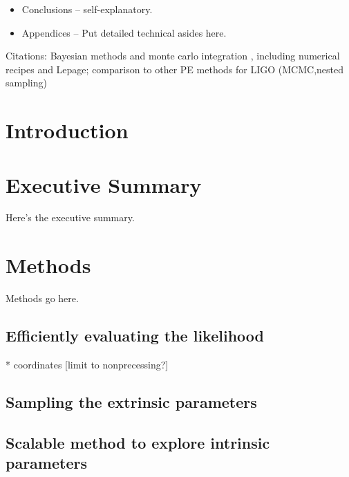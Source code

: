 \documentclass[twocolumn,prd,nofootinbib]{revtex4}
\begin{document}
\begin{widetext}
\begin{itemize}
\item Conclusions -- self-explanatory.

\item Appendices -- Put detailed technical asides here.

\end{itemize}

Citations: Bayesian methods and monte carlo integration \cite{2011RvMP...83..943V}, including numerical recipes and Lepage; comparison
to other PE methods for LIGO
(MCMC,nested sampling) \cite{LIGO-CBC-S6-PE,2011PhRvD..83h2002D,2011PhRvD..84f2003C,gr-extensions-tests-Europeans2011,gwastro-mergers-PE-Aylott-LIGOATest,2011ApJ...739...99N,2012PhRvD..85j4045V,gw-astro-PE-Raymond,gw-astro-PE-lalinference-v1}

\tableofcontents

\end{widetext}

\section{Introduction}

\section{Executive Summary}

Here's the executive summary.

\section{Methods}

Methods go here.

\subsection{Efficiently evaluating the likelihood}

* coordinates [limit to nonprecessing?]

\subsection{Sampling the extrinsic parameters}

\subsection{Scalable method to explore intrinsic parameters }
\end{document}
